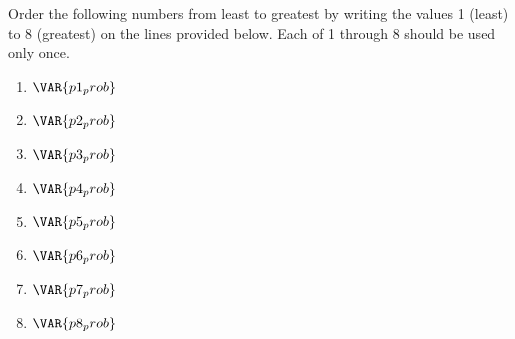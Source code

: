
Order the following numbers from least to greatest by writing the values 1 (least) to 8 (greatest) on the lines provided below. Each of 1 through 8 should be used only once.\\

\begin{enumerate}
    \doublespacing

    \item {} $\VAR{p1_prob}$\\

    \item {} $\VAR{p2_prob}$\\

    \item {} $\VAR{p3_prob}$\\

    \item {} $\VAR{p4_prob}$\\

    \item {} $\VAR{p5_prob}$\\

    \item {} $\VAR{p6_prob}$\\

    \item {} $\VAR{p7_prob}$\\

    \item {} $\VAR{p8_prob}$\\

\end{enumerate}

\trueemptypage